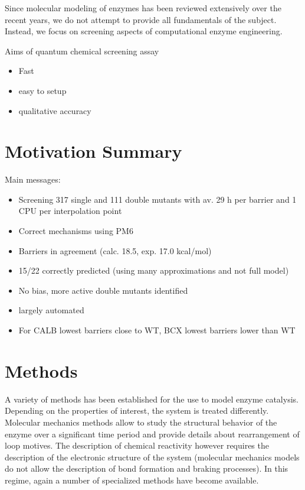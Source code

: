 Since molecular modeling of enzymes has been reviewed extensively over the recent years, we do not attempt to provide all fundamentals of the subject.
Instead, we focus on screening aspects of computational enzyme engineering.

Aims of quantum chemical screening assay
\begin{itemize}
\item Fast
\item easy to setup
\item qualitative accuracy
\end{itemize}


\section{Motivation Summary}\label{sec:mot_sum}
Main messages:
\begin{itemize}
\item Screening 317 single and 111 double mutants with av. 29 h per barrier and 1 CPU per interpolation point
\item Correct mechanisms using PM6
\item Barriers in agreement (calc. 18.5, exp. 17.0 kcal/mol)
\item 15/22 correctly predicted (using many approximations and not full model)
\item No bias, more active double mutants identified
\item largely automated
\item For CALB lowest barriers close to WT, BCX lowest barriers lower than WT
\end{itemize}


\section{Methods}\label{sec:methods}
A variety of methods has been established for the use to model enzyme catalysis.
Depending on the properties of interest, the system is treated differently.
Molecular mechanics methods allow to study the structural behavior of the enzyme over a significant time period and provide details about rearrangement of loop motives.
The description of chemical reactivity however requires the description of the electronic structure of the system (molecular mechanics models do not allow the description of bond formation and braking processes).
In this regime, again a number of specialized methods have become available.

